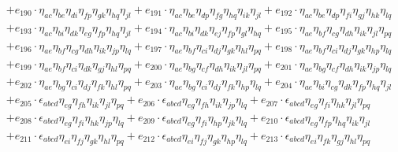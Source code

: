 \begin{itemize}
{\begin{minipage}[t]{\linewidth}
\begin{align}
    & + e_{190} \cdot \eta_{a c} \eta_{b e} \eta_{d i} \eta_{f p} \eta_{g k} \eta_{h q} \eta_{j l} + e_{191} \cdot \eta_{a c} \eta_{b e} \eta_{d p} \eta_{f g} \eta_{h q} \eta_{i k} \eta_{j l} + e_{192} \cdot \eta_{a c} \eta_{b e} \eta_{d p} \eta_{f i} \eta_{g j} \eta_{h k} \eta_{l q} \nonumber \\
    & + e_{193} \cdot \eta_{a c} \eta_{b i} \eta_{d k} \eta_{e g} \eta_{f p} \eta_{h q} \eta_{j l} + e_{194} \cdot \eta_{a c} \eta_{b i} \eta_{d k} \eta_{e j} \eta_{f p} \eta_{g l} \eta_{h q} + e_{195} \cdot \eta_{a e} \eta_{b f} \eta_{c g} \eta_{d h} \eta_{i k} \eta_{j l} \eta_{p q} \nonumber \\
    & + e_{196} \cdot \eta_{a e} \eta_{b f} \eta_{c g} \eta_{d h} \eta_{i k} \eta_{j p} \eta_{l q} + e_{197} \cdot \eta_{a e} \eta_{b f} \eta_{c i} \eta_{d j} \eta_{g k} \eta_{h l} \eta_{p q} + e_{198} \cdot \eta_{a e} \eta_{b f} \eta_{c i} \eta_{d j} \eta_{g k} \eta_{h p} \eta_{l q} \nonumber \\
    & + e_{199} \cdot \eta_{a e} \eta_{b f} \eta_{c i} \eta_{d k} \eta_{g j} \eta_{h l} \eta_{p q} + e_{200} \cdot \eta_{a e} \eta_{b g} \eta_{c f} \eta_{d h} \eta_{i k} \eta_{j l} \eta_{p q} + e_{201} \cdot \eta_{a e} \eta_{b g} \eta_{c f} \eta_{d h} \eta_{i k} \eta_{j p} \eta_{l q} \nonumber \\
    & + e_{202} \cdot \eta_{a e} \eta_{b g} \eta_{c i} \eta_{d j} \eta_{f k} \eta_{h l} \eta_{p q} + e_{203} \cdot \eta_{a e} \eta_{b g} \eta_{c i} \eta_{d j} \eta_{f k} \eta_{h p} \eta_{l q} + e_{204} \cdot \eta_{a e} \eta_{b i} \eta_{c g} \eta_{d k} \eta_{f p} \eta_{h q} \eta_{j l} \nonumber \\
    & + e_{205} \cdot \epsilon_{a b c d} \eta_{e g} \eta_{f h} \eta_{i k} \eta_{j l} \eta_{p q} + e_{206} \cdot \epsilon_{a b c d} \eta_{e g} \eta_{f h} \eta_{i k} \eta_{j p} \eta_{l q} + e_{207} \cdot \epsilon_{a b c d} \eta_{e g} \eta_{f i} \eta_{h k} \eta_{j l} \eta_{p q} \nonumber \\
    & + e_{208} \cdot \epsilon_{a b c d} \eta_{e g} \eta_{f i} \eta_{h k} \eta_{j p} \eta_{l q} + e_{209} \cdot \epsilon_{a b c d} \eta_{e g} \eta_{f i} \eta_{h p} \eta_{j k} \eta_{l q} + e_{210} \cdot \epsilon_{a b c d} \eta_{e g} \eta_{f p} \eta_{h q} \eta_{i k} \eta_{j l} \nonumber \\
    & + e_{211} \cdot \epsilon_{a b c d} \eta_{e i} \eta_{f j} \eta_{g k} \eta_{h l} \eta_{p q} + e_{212} \cdot \epsilon_{a b c d} \eta_{e i} \eta_{f j} \eta_{g k} \eta_{h p} \eta_{l q} + e_{213} \cdot \epsilon_{a b c d} \eta_{e i} \eta_{f k} \eta_{g j} \eta_{h l} \eta_{p q} \nonumber \\

\end{align}
\end{minipage}}
\end{itemize}
